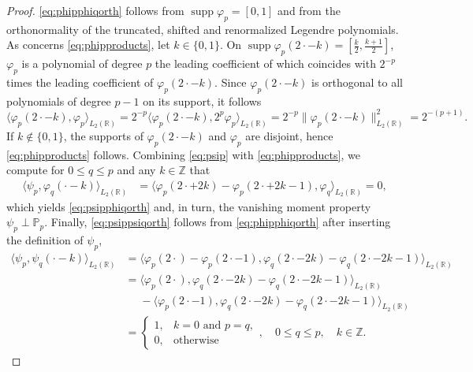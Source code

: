 \documentclass{article}
\DeclareMathOperator{\supp}{supp}
\begin{document}
\begin{proof}
  \eqref{eq:phipphiqorth} follows from $\supp\varphi_p=[0,1]$ and from the orthonormality of the truncated, shifted and renormalized Legendre polynomials. As concerns \eqref{eq:phipproducts}, let $k\in\{0,1\}$. On $\supp\varphi_p(2\cdot-k)=[\frac{k}{2},\frac{k+1}{2}]$,
  $\varphi_p$ is a polynomial of degree $p$ the leading
  coefficient of which coincides with $2^{-p}$ times the leading coefficient of $\varphi_p(2\cdot-k)$.
  Since $\varphi_p(2\cdot-k)$ is orthogonal to all polynomials of degree $p-1$ on its support,
  it follows
  \begin{equation*}
    \big\langle\varphi_p(2\cdot-k),\varphi_p\big\rangle_{L_2(\mathbb R)}
    =
    2^{-p}\big\langle\varphi_p(2\cdot-k),2^p\varphi_p\big\rangle_{L_2(\mathbb R)}
    =
    2^{-p}\big\|\varphi_p(2\cdot-k)\|_{L_2(\mathbb R)}^2
    =
    2^{-(p+1)}.
  \end{equation*}
  If $k\notin\{0,1\}$, the supports of $\varphi_p(2\cdot-k)$ and $\varphi_p$
  are disjoint, hence \eqref{eq:phipproducts} follows.
  Combining \eqref{eq:psip} with \eqref{eq:phipproducts},
  we compute for $0\le q\le p$ and any $k\in\mathbb Z$ that
  \begin{align*}
    \big\langle\psi_p,\varphi_q(\cdot-k)\big\rangle_{L_2(\mathbb R)}
    &=
    \big\langle\varphi_p(2\cdot+2k)-\varphi_p(2\cdot+2k-1),\varphi_q\big\rangle_{L_2(\mathbb R)}
    =0,
  \end{align*}
  which yields \eqref{eq:psipphiqorth} and, in turn, the vanishing moment property
  $\psi_p\perp\mathbb P_p$. Finally, \eqref{eq:psippsiqorth} follows from \eqref{eq:phipphiqorth} after inserting the definition of $\psi_p$,
  \begin{align*}
  \big\langle\psi_p,\psi_q(\cdot-k)\big\rangle_{L_2(\mathbb R)}
  &=
  \big\langle\varphi_p(2\cdot)-\varphi_p(2\cdot-1),\varphi_q(2\cdot-2k)-\varphi_q(2\cdot-2k-1)\big\rangle_{L_2(\mathbb R)}\\
  &=
  \big\langle\varphi_p(2\cdot),\varphi_q(2\cdot-2k)-\varphi_q(2\cdot-2k-1)\big\rangle_{L_2(\mathbb R)}\\
  &\phantom{=}
  -\big\langle\varphi_p(2\cdot-1),\varphi_q(2\cdot-2k)-\varphi_q(2\cdot-2k-1)\big\rangle_{L_2(\mathbb R)}\\
  &=
  \begin{cases}
  1,&k=0\text{ and }p=q,\\
  0,&\text{otherwise}
  \end{cases},\quad 0\le q\le p,\quad k\in\mathbb Z.
  \end{align*}
\end{proof}
\end{document}
